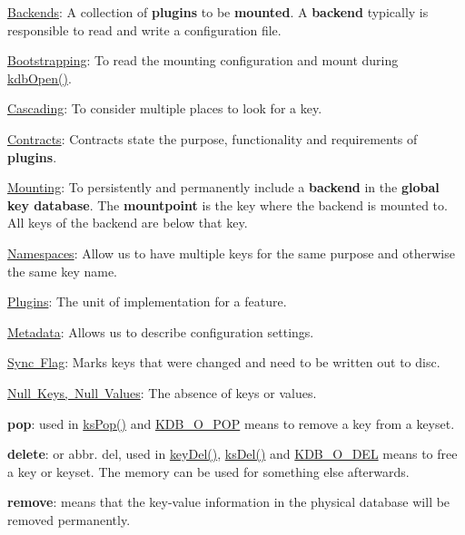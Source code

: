 \begin{DoxyItemize}
\item \mbox{\hyperlink{doc_help_elektra-backends_md}{Backends}}\+: A collection of {\bfseries{plugins}} to be {\bfseries{mounted}}. A {\bfseries{backend}} typically is responsible to read and write a configuration file.
\item \mbox{\hyperlink{doc_help_elektra-bootstrapping_md}{Bootstrapping}}\+: To read the mounting configuration and mount during {\ttfamily \mbox{\hyperlink{group__kdb_ga6808defe5870f328dd17910aacbdc6ca}{kdb\+Open()}}}.
\item \mbox{\hyperlink{doc_help_elektra-cascading_md}{Cascading}}\+: To consider multiple places to look for a key.
\item \mbox{\hyperlink{doc_help_elektra-contracts_md}{Contracts}}\+: Contracts state the purpose, functionality and requirements of {\bfseries{plugins}}.
\item \mbox{\hyperlink{doc_help_elektra-mounting_md}{Mounting}}\+: To persistently and permanently include a {\bfseries{backend}} in the {\bfseries{global key database}}. The {\bfseries{mountpoint}} is the key where the backend is mounted to. All keys of the backend are below that key.
\item \mbox{\hyperlink{doc_help_elektra-namespaces_md}{Namespaces}}\+: Allow us to have multiple keys for the same purpose and otherwise the same key name.
\item \mbox{\hyperlink{src_plugins_README_md}{Plugins}}\+: The unit of implementation for a feature.
\item \mbox{\hyperlink{doc_help_elektra-metadata_md}{Metadata}}\+: Allows us to describe configuration settings.
\end{DoxyItemize}


\begin{DoxyItemize}
\item \mbox{\hyperlink{doc_help_elektra-sync-flag_md}{Sync Flag}}\+: Marks keys that were changed and need to be written out to disc.
\item \mbox{\hyperlink{doc_help_elektra-values_md}{Null Keys, Null Values}}\+: The absence of keys or values.
\item {\bfseries{pop}}\+: used in {\ttfamily \mbox{\hyperlink{group__keyset_gae42530b04defb772059de0600159cf69}{ks\+Pop()}}} and \mbox{\hyperlink{group__keyset_gga98a3d6a4016c9dad9cbd1a99a9c2a45aa52fb5f2cc86773d393da62bebebf7984}{K\+D\+B\+\_\+\+O\+\_\+\+P\+OP}} means to remove a key from a keyset.
\item {\bfseries{delete}}\+: or abbr. del, used in {\ttfamily \mbox{\hyperlink{group__key_ga3df95bbc2494e3e6703ece5639be5bb1}{key\+Del()}}}, {\ttfamily \mbox{\hyperlink{group__keyset_ga27e5c16473b02a422238c8d970db7ac8}{ks\+Del()}}} and \mbox{\hyperlink{group__keyset_gga98a3d6a4016c9dad9cbd1a99a9c2a45aa66a5380c120f25f28f49848c4a863ead}{K\+D\+B\+\_\+\+O\+\_\+\+D\+EL}} means to free a key or keyset. The memory can be used for something else afterwards.
\item {\bfseries{remove}}\+: means that the key-\/value information in the physical database will be removed permanently. 
\end{DoxyItemize}